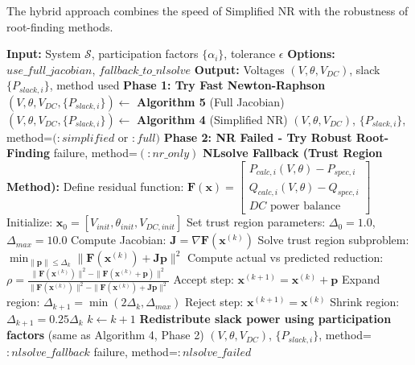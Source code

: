 \documentclass[11pt]{article}
\begin{document}
The hybrid approach combines the speed of Simplified NR with the robustness of root-finding methods.

\begin{algorithm}
\caption{Hybrid Power Flow Solver}
\begin{algorithmic}[1]
\STATE \textbf{Input:} System $\mathcal{S}$, participation factors $\{\alpha_i\}$, tolerance $\epsilon$
\STATE \textbf{Options:} $use\_full\_jacobian$, $fallback\_to\_nlsolve$
\STATE \textbf{Output:} Voltages $(V, \theta, V_{DC})$, slack $\{P_{slack,i}\}$, method used
\STATE
\STATE \textbf{Phase 1: Try Fast Newton-Raphson}
    \STATE $(V, \theta, V_{DC}, \{P_{slack,i}\}) \gets$ \textbf{Algorithm 5} (Full Jacobian)
\ELSE
    \STATE $(V, \theta, V_{DC}, \{P_{slack,i}\}) \gets$ \textbf{Algorithm 4} (Simplified NR)
\ENDIF
\STATE
{}
    \RETURN $(V, \theta, V_{DC})$, $\{P_{slack,i}\}$, method=$(:simplified$ or $:full)$
\ENDIF
\STATE
\STATE \textbf{Phase 2: NR Failed - Try Robust Root-Finding}
    \RETURN failure, method=$(:nr\_only)$
\ENDIF
\STATE
\STATE \textbf{NLsolve Fallback (Trust Region Method):}
\STATE Define residual function:
\STATE \quad $\mathbf{F}(\mathbf{x}) = \begin{bmatrix} P_{calc,i}(V, \theta) - P_{spec,i} \\ Q_{calc,i}(V, \theta) - Q_{spec,i} \\ DC \text{ power balance} \end{bmatrix}$
\STATE
\STATE Initialize: $\mathbf{x}_0 = [V_{init}, \theta_{init}, V_{DC,init}]$
\STATE Set trust region parameters: $\Delta_0 = 1.0$, $\Delta_{max} = 10.0$
\STATE
\REPEAT
    \STATE Compute Jacobian: $\mathbf{J} = \nabla \mathbf{F}(\mathbf{x}^{(k)})$ 
    \STATE Solve trust region subproblem:
    \STATE \quad $\min_{\|\mathbf{p}\| \leq \Delta_k} \|\mathbf{F}(\mathbf{x}^{(k)}) + \mathbf{J}\mathbf{p}\|^2$
    \STATE
    \STATE Compute actual vs predicted reduction:
    \STATE \quad $\rho = \frac{\|\mathbf{F}(\mathbf{x}^{(k)})\|^2 - \|\mathbf{F}(\mathbf{x}^{(k)} + \mathbf{p})\|^2}{\|\mathbf{F}(\mathbf{x}^{(k)})\|^2 - \|\mathbf{F}(\mathbf{x}^{(k)}) + \mathbf{J}\mathbf{p}\|^2}$
    \STATE
        \STATE Accept step: $\mathbf{x}^{(k+1)} = \mathbf{x}^{(k)} + \mathbf{p}$
            \STATE Expand region: $\Delta_{k+1} = \min(2\Delta_k, \Delta_{max})$
        \ENDIF
    \ELSE
        \STATE Reject step: $\mathbf{x}^{(k+1)} = \mathbf{x}^{(k)}$
        \STATE Shrink region: $\Delta_{k+1} = 0.25 \Delta_k$
    \ENDIF
    \STATE $k \gets k + 1$
\STATE
{}
    \STATE \textbf{Redistribute slack power using participation factors}
    \STATE (same as Algorithm 4, Phase 2)
    \RETURN $(V, \theta, V_{DC})$, $\{P_{slack,i}\}$, method=$:nlsolve\_fallback$
\ELSE
    \RETURN failure, method=$:nlsolve\_failed$
\ENDIF
\end{algorithmic}
\end{algorithm}
\end{document}
